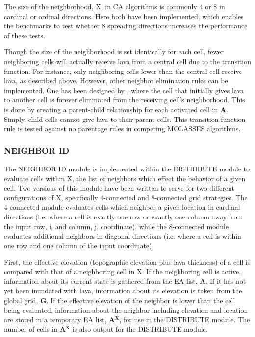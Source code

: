 \documentclass[12pt,letter]{article}
\begin{document}
			The size of the neighborhood, X, in CA algorithms is commonly 4 or 8 in cardinal or ordinal directions. Here both have been implemented, which enables the benchmarks to test whether 8 spreading directions increases the performance of these tests.

			Though the size of the neighborhood is set identically for each cell, fewer neighboring cells will actually receive lava from a central cell due to the transition function. For instance, only neighboring cells lower than the central cell receive lava, as described above. However, other neighbor elimination rules can be implemented. One has been designed by \citet{connor2012}, where the cell that initially gives lava to another cell is forever eliminated from the receiving cell's neighborhood. This is done by creating a parent-child relationship for each activated cell in \textbf{A}. Simply, child cells cannot give lava to their parent cells. This transition function rule is tested against no parentage rules in competing MOLASSES algorithms.
			
		\subsubsection{NEIGHBOR ID}
			
			The NEIGHBOR ID module is implemented within the DISTRIBUTE module to evaluate cells within X, the list of neighbors which effect the behavior of a given cell. Two versions of this module have been written to serve for two different configurations of X, specifically 4-connected and 8-connected grid strategies. The 4-connected module evaluates cells which neighbor a given location in cardinal directions (i.e. where a cell is exactly one row or exactly one column away from the input row, i, and column, j, coordinate), while the 8-connected module evaluates additional neighbors in diagonal directions (i.e. where a cell is within one row and one column of the input coordinate).
			
			First, the effective elevation (topographic elevation plus lava thickness) of a cell is compared with that of a neighboring cell in X. If the neighboring cell is active, information about its current state is gathered from the EA list, \textbf{A}. If it has not yet been inundated with lava, information about its elevation is taken from the global grid, \textbf{G}. If the effective elevation of the neighbor is lower than the cell being evaluated, information about the neighbor including elevation and location are stored in a temporary EA list, \textbf{A}$^{\mathbf{X}}$, for use in the DISTRIBUTE module. The number of cells in \textbf{A}$^{\mathbf{X}}$ is also output for the DISTRIBUTE module.
			
\end{document}
